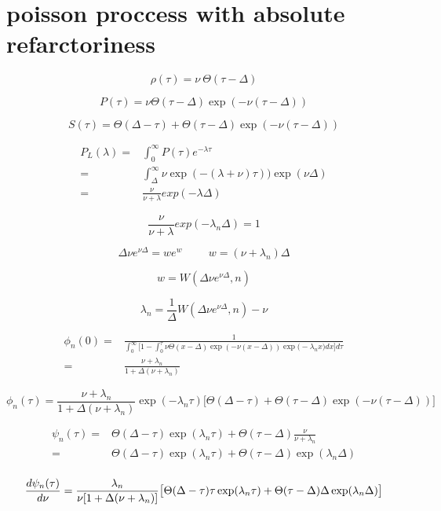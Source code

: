 \documentclass[a4paper,12pt,twoside]{article}
\def \be {\begin{equation}}
\def \ee {\end{equation}}
\begin{document}
\section{poisson proccess with absolute refarctoriness}

\be
\rho(\tau)=\nu\:\Theta(\tau-\Delta)
\ee

\be
P(\tau)=\nu \Theta(\tau-\Delta) \exp(-\nu(\tau-\Delta))
\ee


\be
S(\tau)=\Theta(\Delta-\tau) +  \Theta(\tau-\Delta) \exp(-\nu(\tau-\Delta))
\ee

\begin{align}
P_L(\lambda)=&\int_0^\infty P(\tau)e^{-\lambda \tau}\\
=&\int_\Delta^\infty \nu \exp(-(\lambda+\nu)\tau))\exp(\nu \Delta)\\
=&\frac{\nu}{\nu+\lambda}exp(-\lambda \Delta)
\end{align}

\be
\frac{\nu}{\nu+\lambda}exp(-\lambda_n \Delta)=1
\ee

\be
\Delta \nu e^{\nu\Delta}=we^{w} \hspace{1cm} w=(\nu+\lambda_n)\Delta
\ee

\be
w=W(\Delta \nu e^{\nu\Delta},n)
\ee

\be
\lambda_n=\frac{1}{\Delta}W(\Delta \nu e^{\nu\Delta},n) - \nu
\ee

\begin{align}
\phi_n(0) =&\frac{1}{\int_0^{\infty}\big[1-\int^\tau_0 \nu \Theta(x-\Delta) \exp(-\nu(x-\Delta)) \exp\big(-\lambda_nx)dx\big]d\tau}\\
=& \frac{\nu+\lambda_n}{1+\Delta(\nu+\lambda_n)}
\end{align}

\be
\phi_n(\tau)= \frac{\nu+\lambda_n}{1+\Delta(\nu+\lambda_n)}\exp(-\lambda_n\tau)\big[\Theta(\Delta-\tau) +  \Theta(\tau-\Delta) \exp(-\nu(\tau-\Delta))\big]
\ee


\begin{align}
\psi_n(\tau)=&\Theta(\Delta-\tau)\exp(\lambda_n\tau) +  \Theta(\tau-\Delta) \frac{\nu}{\nu+\lambda_n}\\
=&\Theta(\Delta-\tau)\exp(\lambda_n\tau) +  \Theta(\tau-\Delta) \exp(\lambda_n\Delta)\\
\end{align}


\be
\frac{d\psi_n(\tau)}{d\nu}=\frac{\lambda_n}{\nu[1+\Delta(\nu+\lambda_n)]}\big[\Theta(\Delta-\tau)\tau\exp(\lambda_n\tau) +  \Theta(\tau-\Delta)\Delta \exp(\lambda_n\Delta)\big]\\
\ee
\end{document}
